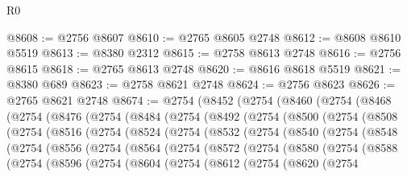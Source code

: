 \begin{lexlean}{R0}
\begin{coremodule}
@8608 := @2756 @8607
@8610 := @2765 @8605 @2748
@8612 := @8608 @8610 @5519
@8613 := @8380 @2312
@8615 := @2758 @8613 @2748
@8616 := @2756 @8615
@8618 := @2765 @8613 @2748
@8620 := @8616 @8618 @5519
@8621 := @8380 @689
@8623 := @2758 @8621 @2748
@8624 := @2756 @8623
@8626 := @2765 @8621 @2748
@8674 := @2754
    (@8452
      (@2754
        (@8460
          (@2754
            (@8468
              (@2754
                (@8476
                  (@2754
                    (@8484
                      (@2754
                        (@8492
                          (@2754
                            (@8500
                              (@2754
                                (@8508
                                  (@2754
                                    (@8516
                                      (@2754
                                        (@8524
                                          (@2754
                                            (@8532
                                              (@2754
                                                (@8540
                                                  (@2754
                                                    (@8548
                                                      (@2754
                                                        (@8556
                                                          (@2754
                                                            (@8564
                                                              (@2754
                                                                (@8572
                                                                  (@2754
                                                                    (@8580
                                                                      (@2754
                                                                        (@8588
                                                                          (@2754
                                                                            (@8596
                                                                              (@2754
                                                                                (@8604
                                                                                  (@2754
                                                                                    (@8612
                                                                                      (@2754
                                                                                        (@8620
                                                                                          (@2754

\end{coremodule}
\end{lexlean}
